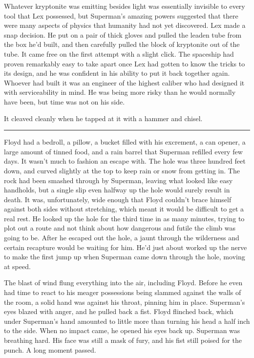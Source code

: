 Whatever kryptonite was emitting besides light was essentially invisible
to every tool that Lex possessed, but Superman's amazing powers
suggested that there were many aspects of physics that humanity had not
yet discovered. Lex made a snap decision. He put on a pair of thick
gloves and pulled the leaden tube from the box he'd built, and then
carefully pulled the block of kryptonite out of the tube. It came free
on the first attempt with a slight click. The spaceship had proven
remarkably easy to take apart once Lex had gotten to know the tricks to
its design, and he was confident in his ability to put it back together
again. Whoever had built it was an engineer of the highest caliber who
had designed it with serviceability in mind. He was being more risky
than he would normally have been, but time was not on his side.

It cleaved cleanly when he tapped at it with a hammer and chisel.

\begin{center}\rule{0.5\linewidth}{0.5pt}\end{center}

Floyd had a bedroll, a pillow, a bucket filled with his excrement, a can
opener, a large amount of tinned food, and a rain barrel that Superman
refilled every few days. It wasn't much to fashion an escape with. The
hole was three hundred feet down, and curved slightly at the top to keep
rain or snow from getting in. The rock had been smashed through by
Superman, leaving what looked like easy handholds, but a single slip
even halfway up the hole would surely result in death. It was,
unfortunately, wide enough that Floyd couldn't brace himself against
both sides without stretching, which meant it would be difficult to get
a real rest. He looked up the hole for the third time in as many
minutes, trying to plot out a route and not think about how dangerous
and futile the climb was going to be. After he escaped out the hole, a
jaunt through the wilderness and certain recapture would be waiting for
him. He'd just about worked up the nerve to make the first jump up when
Superman came down through the hole, moving at speed.

The blast of wind flung everything into the air, including Floyd. Before
he even had time to react to his meager possessions being slammed
against the walls of the room, a solid hand was against his throat,
pinning him in place. Superman's eyes blazed with anger, and he pulled
back a fist. Floyd flinched back, which under Superman's hand amounted
to little more than turning his head a half inch to the side. When no
impact came, he opened his eyes back up. Superman was breathing hard.
His face was still a mask of fury, and his fist still poised for the
punch. A long moment passed.

